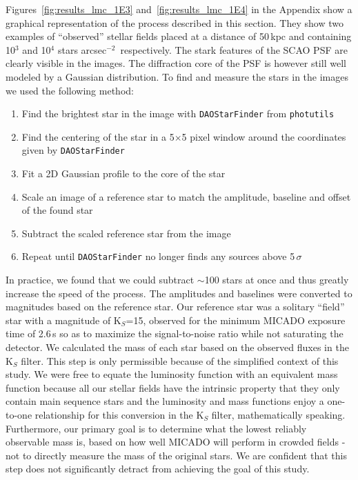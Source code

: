 \documentclass[referee]{aa}
\newcommand{\sig}{$\sigma$~}
\newcommand{\s}{$\sim$}
\newcommand{\spa}{stars arcsec$^{-2}$~}
\begin{document}
Figures~\ref{fig:results_lmc_1E3} and~\ref{fig:results_lmc_1E4} in the Appendix show a graphical representation of the process described in this section.
They show two examples of ``observed'' stellar fields placed at a distance of 50\,kpc and containing 10$^3$ and 10$^4$ \spa respectively.
The stark features of the SCAO PSF are clearly visible in the images.
The diffraction core of the PSF is however still well modeled by a Gaussian distribution.
To find and measure the stars in the images we used the following method:

\begin{enumerate}
    \item Find the brightest star in the image with \verb+DAOStarFinder+ from \verb+photutils+~\citep{photutils}
    \item Find the centering of the star in a 5$\times$5 pixel window around the coordinates given by \verb+DAOStarFinder+
    \item Fit a 2D Gaussian profile to the core of the star
    \item Scale an image of a reference star to match the amplitude, baseline and offset of the found star
    \item Subtract the scaled reference star from the image
    \item Repeat until \verb+DAOStarFinder+ no longer finds any sources above 5\,\sig
\end{enumerate}

In practice, we found that we could subtract \s100 stars at once and thus greatly increase the speed of the process.
The amplitudes and baselines were converted to magnitudes based on the reference star.
Our reference star was a solitary ``field'' star with a magnitude of K$_S$=15, observed for the minimum {MICADO} exposure time of 2.6\,s so as to maximize the signal-to-noise ratio while not saturating the detector.
We calculated the mass of each star based on the observed fluxes in the K$_S$ filter.
This step is only permissible because of the simplified context of this study.
We were free to equate the luminosity function with an equivalent mass function because all our stellar fields have the intrinsic property that they only contain main sequence stars and the luminosity and mass functions enjoy a one-to-one relationship for this conversion in the K$_S$ filter, mathematically speaking.
Furthermore, our primary goal is to determine what the lowest reliably observable mass is, based on how well MICADO will perform in crowded fields - not to directly measure the mass of the original stars.
We are confident that this step does not significantly detract from achieving the goal of this study.
\end{document}
